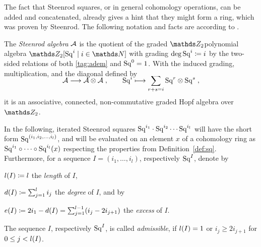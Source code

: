 The fact that Steenrod squares, or in general cohomology operations,
can be added and concatenated, already gives a hint that they might
form a ring, which was proven by Steenrod. The following notation and
facts are according to \cite[Chap.~6]{mosher}.
\begin{Def}\label{def:steenrodalgebra}
  The \emph{Steenrod algebra} $\mathcal{A}$ is the quotient
  of the graded $\Zmod2$\nbd{}polynomial algebra
  $\Zmod2[\Sq i\mid i\in\Nat]$ with grading $\deg \mathrm{Sq}^{i}\coloneqq i$
  by the two-sided relations of both \ref{tag:adem} and $\mathrm{Sq}^{0}=1$.
  With the induced grading, multiplication, and the diagonal defined
  by
  \begin{gather*}
    \SwapAboveDisplaySkip
    \A\longto \A\otimes\A
    \;,\qquad
    \Sq i\longmapsto\sum_{r+s=i}\Sq r\otimes\Sq s
    \;,
  \end{gather*}
  it is an associative, connected, non-commutative graded Hopf algebra
  over $\Zmod2$.
\end{Def}
\begin{Not}
  In the following, iterated Steenrod squares
  $\mathrm{Sq}^{i_1}\cdot\mathrm{Sq}^{i_2}\dotsm\mathrm{Sq}^{i_l}$ will have the short form
  $\mathrm{Sq}^{(i_1,i_2,\dotsc,i_l)}$,
  and will be evaluated on an element $x$ of a cohomology ring as
  $\mathrm{Sq}^{i_1}\circ\dotsb\circ\mathrm{Sq}^{i_l}(x)$ respecting the
  properties from Definition~\ref{def:sq}.
  Furthermore, for a sequence $I=(i_1,\dotsc,i_l)$,
  respectively $\mathrm{Sq}^{I}$, denote by
  \begin{compactdescription}[labelindent=1em]
  \item[$l(I)\coloneqq l$] the \emph{length} of $I$,
  \item[$d(I)\coloneqq \sum_{j=1}^{l} i_j$] the \emph{degree} of $I$,
    and by
  \item[$e(I)\coloneqq 2i_1-d(I)=\sum_{j=1}^{l-1}(i_j-2i_{j+1})$]
    the \emph{excess} of $I$.
  \end{compactdescription}
  The sequence $I$, respectively $\mathrm{Sq}^{I}$, is called \emph{admissible},
  if $l(I)=1$ or $i_j\geq 2i_{j+1}$ for $0\leq j<l(I)$.
\end{Not}
